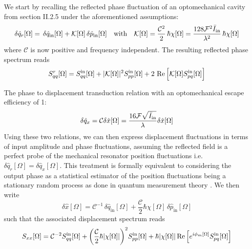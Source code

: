 We start by recalling the reflected phase fluctuation of an optomechanical cavity from section II.2.5 under the aforementioned assumptions:
\begin{equation*}
\delta \hat{q}_r[\Omega] = \, \delta \hat{q}_{\mathrm{in}}[\Omega]  + \mathcal{K}[\Omega]\, \delta \hat{p}_{\mathrm{in}}[\Omega] \quad  \text{with} \quad \mathcal{K}[\Omega] = \frac{\mathcal{C}^2}{2}   \,\hbar  \chi[\Omega] =  \dfrac{128 \mathcal{F}^2 \bar I_{\rm in}}{\lambda^2}  \,  \hbar  \chi[\Omega]
\end{equation*}
where $\mathcal{C}$ is now positive and frequency independent. The resulting reflected phase spectrum reads
\begin{equation*}
  S_{qq}^{r}[\Omega] = S_{qq}^{\rm in}[\Omega] + |\mathcal{K}[\Omega]|^2 S_{pp}^{\rm in}[\Omega] + 2 \, \Re\Big[ \mathcal{K}[\Omega] S_{pq}^{\rm in}[\Omega]\Big]
\end{equation*}

The phase to displacement transduction relation with an optomechanical escape efficiency of 1:
\begin{equation*}
   \delta \hat q_x = \mathcal{C} \delta \hat x [\Omega] = \frac{16 \mathcal{F}\sqrt{\bar I_{\rm in}}}{\lambda}\delta \hat{x}[\Omega]  
\end{equation*}
Using these two relations, we can then express displacement fluctuations in terms of input amplitude and phase fluctuations, assuming the reflected field is a perfect probe of the mechanical resonator position fluctuations i.e. $\delta \hat q_r[\Omega] = \delta \hat q_x[\Omega]$. This treatment is formally equivalent to considering the output phase as a statistical estimator of the position fluctuations being a stationary random process as done in quantum measurement theory \cite{clerk_introduction_2010}. We then write
\begin{equation}
  \delta \hat{x}[\Omega] =\mathcal{C}^{-1} \, \delta \hat{q}_{\mathrm{in}}[\Omega]  + \dfrac{\mathcal{C} }{2} \hbar \chi[\Omega] \, \delta \hat{p}_{\mathrm{in}}[\Omega]
\end{equation}
such that the associated displacement spectrum reads
\begin{equation}
      S_{xx}[\Omega] = \mathcal{C}^{-2} S_{qq}^{\rm in}[\Omega] + \bigg(\dfrac{\mathcal{C} }{2} \hbar |\chi[\Omega]| \bigg)^2 S_{pp}^{\rm in}[\Omega]   + \hbar |\chi[\Omega]| \Re\Big[  e^{i\phi_m[\Omega]} S_{pq}^{\rm in}[\Omega]\Big]
  \label{eq:total_displacement_spectrum}
\end{equation}

